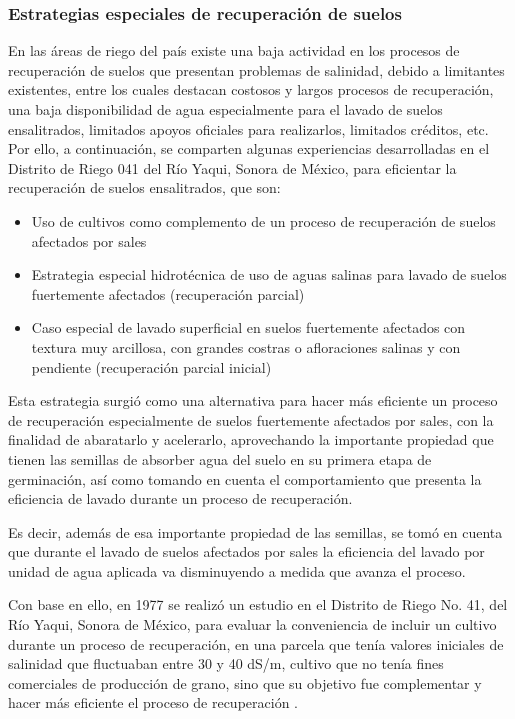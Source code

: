 \subsubsection{Estrategias especiales de recuperación de suelos}
En las áreas de riego del país existe una baja actividad en los procesos de
recuperación de suelos que presentan problemas de salinidad, debido a limitantes
existentes, entre los cuales destacan costosos y largos procesos de recuperación,
una baja disponibilidad de agua especialmente para el lavado de suelos
ensalitrados, limitados apoyos oficiales para realizarlos, limitados créditos, etc.
Por ello, a continuación, se comparten algunas experiencias desarrolladas en el
Distrito de Riego 041 del Río Yaqui, Sonora de México, para eficientar la
recuperación de suelos ensalitrados, que son:
\begin{itemize}
    \item Uso de cultivos como complemento de un proceso de recuperación de suelos afectados por sales
    \item Estrategia especial hidrotécnica de uso de aguas salinas para lavado de suelos fuertemente afectados (recuperación parcial)
    \item Caso especial de lavado superficial en suelos fuertemente afectados con textura muy arcillosa, con grandes costras o afloraciones salinas y con pendiente (recuperación parcial inicial)    
\end{itemize}
Esta estrategia surgió como una alternativa para hacer más eficiente un proceso de recuperación especialmente de suelos fuertemente afectados por sales, con la finalidad de abaratarlo y acelerarlo, aprovechando la importante propiedad que tienen las semillas de absorber agua del suelo en su primera etapa de germinación, así como tomando en cuenta el comportamiento que presenta la eficiencia de lavado durante un proceso de recuperación.

Es decir, además de esa importante propiedad de las semillas, se tomó en cuenta que durante el lavado de suelos afectados por sales la eficiencia del lavado por unidad de agua aplicada va disminuyendo a medida que avanza el proceso.

Con base en ello, en 1977 se realizó un estudio en el Distrito de Riego No. 41, del Río Yaqui, Sonora de México, para evaluar la conveniencia de incluir un cultivo durante un proceso de recuperación, en una parcela que tenía valores iniciales de salinidad que fluctuaban entre 30 y 40 dS/m, cultivo que no tenía fines comerciales de producción de grano, sino que su objetivo fue complementar y hacer más eficiente el proceso de recuperación .

